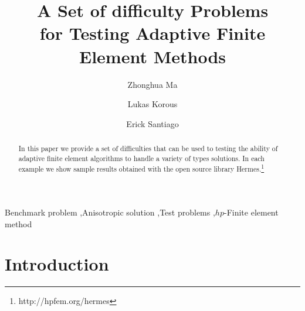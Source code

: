 \documentclass[12pt]{elsarticle}
\begin{document}
\begin{frontmatter}



\title{A Set of difficulty Problems\\ for Testing Adaptive Finite Element Methods}

\author[label1]{Zhonghua Ma}
\author[label2]{Lukas Korous}
\author[label3]{Erick Santiago}
\address[label1]{China University of Petroleum, Beijing, China}
\address[label2]{Charles University, Prague, Czech Republic}
\address[label3]{University of Nevada, Reno, USA}

\begin{abstract}
In this paper we provide a set of difficulties that can be used to
testing the ability of adaptive finite element algorithms to handle
a variety of types solutions. 
In each example we show sample results obtained with the
open source library {\sc Hermes}.\footnote{http://hpfem.org/hermes}
\end{abstract}

\begin{keyword}
Benchmark problem \sep Anisotropic solution \sep Test problems \sep $hp$-Finite element method
\end{keyword}

\end{frontmatter}


\section{Introduction}
\label{sec:intro}
\end{document}
